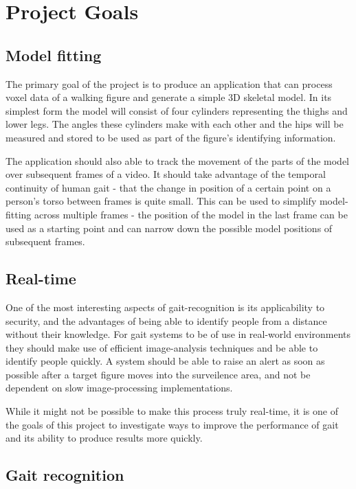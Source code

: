 \section{Project Goals}

\subsection{Model fitting}

The primary goal of the project is to produce an application that can process voxel data of a walking figure and generate a simple 3D skeletal model.
In its simplest form the model will consist of four cylinders representing the thighs and lower legs.
The angles these cylinders make with each other and the hips will be measured and stored to be used as part of the figure's identifying information.

The application should also able to track the movement of the parts of the model over subsequent frames of a video.
It should take advantage of the temporal continuity of human gait - that the change in position of a certain point on a person's torso between frames is quite small.
This can be used to simplify model-fitting across multiple frames -
the position of the model in the last frame can be used as a starting point and can narrow down the possible model positions of subsequent frames.


\subsection{Real-time}

One of the most interesting aspects of gait-recognition is its applicability to security, and the advantages of being able to identify people from a distance without their knowledge.
For gait systems to be of use in real-world environments they should make use of efficient image-analysis techniques and be able to identify people quickly.
A system should be able to raise an alert as soon as possible after a target figure moves into the surveilence area, and not be dependent on slow image-processing implementations.

While it might not be possible to make this process truly real-time, it is one of the goals of this project to investigate ways to improve the performance of gait and its ability to produce results more quickly.


\subsection{Gait recognition}

